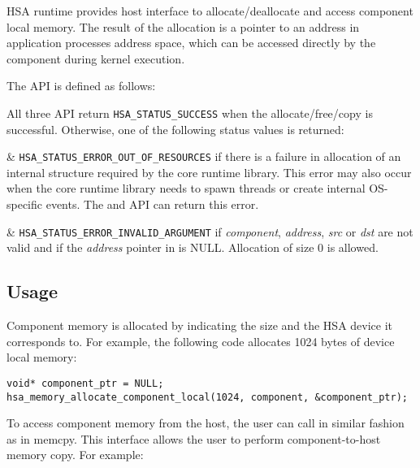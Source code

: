 H\-S\-A runtime provides host interface to allocate/deallocate and
access component local memory. The result of the allocation is a
pointer to an address in application processes address space, which
can be accessed directly by the component during kernel execution. 

The API is defined as follows:



All three API return \texttt{HSA\_STATUS\_SUCCESS} when the
allocate/free/copy is successful. Otherwise, one of the following
status values is returned:

\begin{easylist}

& \texttt{HSA\_STATUS\_ERROR\_OUT\_OF\_RESOURCES} if there is a
failure in allocation of an internal structure required by the core
runtime library. This error may also occur when the core runtime
library needs to spawn threads or create internal OS-specific
events. The  and
 API can
return this error. 

& \texttt{HSA\_STATUS\_ERROR\_INVALID\_ARGUMENT} if {\itshape
component}, {\itshape address}, {\itshape src} or {\itshape dst} are
not valid and if the {\itshape address} pointer in
 is NULL. Allocation
of size 0 is allowed. 

\end{easylist}

\hypertarget{coreapi_device_memory_usage}{}\subsection{Usage}\label{coreapi_device_memory_usage}

Component memory is allocated by indicating the size and the H\-S\-A
device it corresponds to. For example, the following code allocates
1024 bytes of device local memory\-:

\begin{framed}
\begin{lstlisting}
void* component_ptr = NULL;
hsa_memory_allocate_component_local(1024, component, &component_ptr);
\end{lstlisting}
\end{framed}

To access component memory from the host, the user can call
 in similar
fashion as in memcpy. This interface allows the user to
perform component-\/to-\/host memory copy. For example\-:

